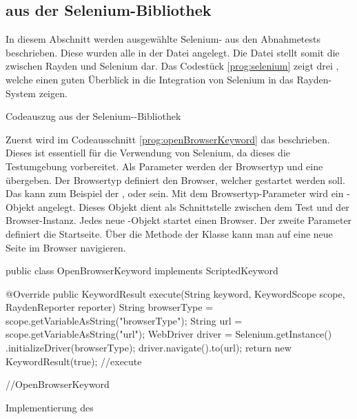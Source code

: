 
\subsection{ aus der Selenium-Bibliothek}
\label{cha:TestenSelenium}

In diesem Abschnitt werden ausgewählte Selenium- aus den Abnahmetests beschrieben. Diese  wurden alle in der Datei  angelegt. Die Datei  stellt somit die  zwischen Rayden und Selenium dar. Das Codestück \ref{prog:selenium} zeigt drei , welche einen guten Überblick in die Integration von Selenium in das Rayden-System zeigen. 

\begin{program}

\caption{Codeauszug aus der Selenium--Bibliothek}
\label{prog:selenium}
\end{program}

\SuperPar
Zuerst wird im Codeausschnitt \ref{prog:openBrowserKeyword} das  beschrieben. Dieses  ist essentiell für die Verwendung von Selenium, da dieses  die Testumgebung vorbereitet. Als Parameter werden der Browsertyp und eine  übergeben. Der Browsertyp definiert den Browser, welcher gestartet werden soll. Das kann zum Beispiel der ,  oder  sein. Mit dem Browsertyp-Parameter wird ein -Objekt angelegt. Dieses Objekt dient als Schnittstelle zwischen dem Test und der Browser-Instanz. Jedes neue -Objekt startet einen Browser. Der zweite Parameter  definiert die Startseite. Über die Methode  der Klasse  kann man auf eine neue Seite im Browser navigieren. 

\begin{program}
\begin{JavaCode}
public class OpenBrowserKeyword implements ScriptedKeyword {

	@Override
	public KeywordResult execute(String keyword, KeywordScope scope, 
	  RaydenReporter reporter) {
		String browserType = scope.getVariableAsString("browserType");
		String url = scope.getVariableAsString("url");
		WebDriver driver = Selenium.getInstance()
		  .initializeDriver(browserType);
		driver.navigate().to(url);
		return new KeywordResult(true);
	} //execute
	
} //OpenBrowserKeyword
\end{JavaCode}
\caption{Implementierung des }
\label{prog:openBrowserKeyword}
\end{program}

